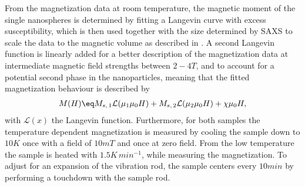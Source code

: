 \documentclass[\main/dresen_thesis.tex]{subfiles}
\begin{document}
    From the magnetization data at room temperature, the magnetic moment of the single nanospheres is determined by fitting a Langevin curve with excess susceptibility, which is then used together with the size determined by SAXS to scale the data to the magnetic volume as described in .
    A second Langevin function is linearly added for a better description of the magnetization data at intermediate magnetic field strengths between $2 - 4 \unit{T}$, and to account for a potential second phase in the nanoparticles, meaning that the fitted magnetization behaviour is described by
    \begin{align}
      M(H) \eq M_{s, \, 1} \mathcal{L} (\mu_{1} \mu_0 H) + M_{s, \, 2} \mathcal{L} (\mu_{2} \mu_0 H) + \chi \mu_0 H,
    \end{align}
    with $\mathcal{L}(x)$ the Langevin function.
    Furthermore, for both samples the temperature dependent magnetization is measured by cooling the sample down to $10 \unit{K}$ once with a field of $10 \unit{mT}$ and once at zero field.
    From the low temperature the sample is heated with $1.5 \unit{K \, min^{-1}}$, while measuring the magnetization.
    To adjust for an expansion of the vibration rod, the sample centers every $10 \unit{min}$ by performing a touchdown with the sample rod.
\end{document}
